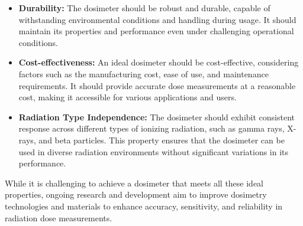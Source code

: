 \documentclass[../../Report.tex]{subfiles}
\begin{document}
\begin{itemize}
            \item \textbf{Durability: } The dosimeter should be robust and durable, capable of withstanding 
            environmental conditions and handling during usage. It should maintain its properties and 
            performance even under challenging operational conditions.

            \item \textbf{Cost-effectiveness: } An ideal dosimeter should be cost-effective, considering 
            factors such as the manufacturing cost, ease of use, and maintenance requirements. It should 
            provide accurate dose measurements at a reasonable cost, making it accessible for various 
            applications and users.

            \item \textbf{Radiation Type Independence: } The dosimeter should exhibit consistent response 
            across different types of ionizing radiation, such as gamma rays, X-rays, and beta particles. 
            This property ensures that the dosimeter can be used in diverse radiation environments without 
            significant variations in its performance.

        \end{itemize}

        While it is challenging to achieve a dosimeter that meets all these ideal properties, ongoing 
        research and development aim to improve dosimetry technologies and materials to enhance accuracy, 
        sensitivity, and reliability in radiation dose measurements.
    
\end{document}
